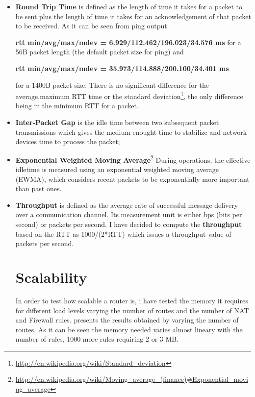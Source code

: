 \begin{itemize}
\item \textbf{Round Trip Time} is defined as the length of time it takes for a packet to be sent plus the length of time it takes for an acknowledgement of that packet to be received.
As it can be seen from ping output 

\textbf{rtt min/avg/max/mdev = 6.929/112.462/196.023/34.576 ms}
for a 56B packet length (the default packet size for ping) and 

\textbf{rtt min/avg/max/mdev = 35.973/114.888/200.100/34.401 ms}

for a 1400B packet size. There is no significant difference for the average,maximum RTT time or the standard deviation\footnote{\url{http://en.wikipedia.org/wiki/Standard_deviation}}, the only difference being in the minimum RTT for a packet.  
\item \textbf{Inter-Packet Gap} is the idle time between two subsequent packet transmissions which gives the medium enought time to stabilize and network devices time to process the packet;

\item \textbf{Exponential Weighted Moving Average}\footnote{\url{http://en.wikipedia.org/wiki/Moving_average_(finance)#Exponential_moving_average}} During operations, the effective idletime is measured using an exponential weighted moving average (EWMA), which considers recent packets to be exponentially more important than past ones. 

\item \textbf{Throughput} is defined as the average rate of successful message delivery over a communication channel. Its measurement unit is either bps (bits per second) or packets per second.
I have decided to compute the \textbf{throughput} based on the RTT as 1000/(2*RTT) which issues a throughput value of  packets per second. 

\section{Scalability}
\label{sec:scalability}

In order to test how scalable a router is, i have tested the memory it requires for different load levels varying the number of routes and the number of NAT and Firewall rules.
 presents the results obtained by varying the number of routes.
As it can be seen the memory needed varies almost lineary with the number of rules, 1000 more rules requiring 2 or 3 MB.


\end{itemize}
